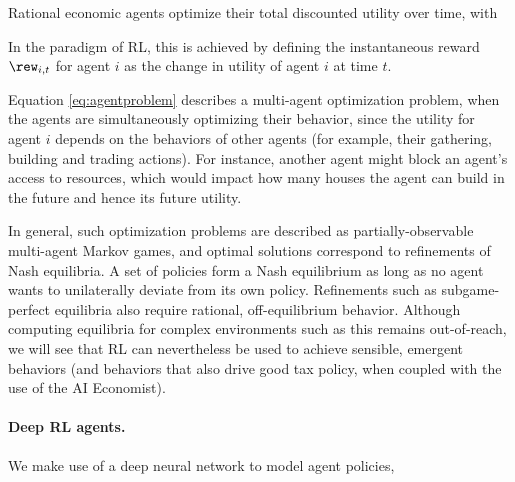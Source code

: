 Rational economic agents optimize their total discounted utility over time, with

In the paradigm of RL, this is achieved  by defining the instantaneous reward $\rew_{i,t}$ for agent $i$ as the change in utility of  agent $i$   at time $t$.


Equation \ref{eq:agentproblem} describes a multi-agent optimization problem, when the agents are simultaneously optimizing their behavior, since the utility for agent $i$ depends on the behaviors of other agents (for example, their gathering, building and trading actions).
For instance, another agent might block an agent's access to resources, which would impact how many houses the agent can build in the future and hence its future utility.

In general, such optimization problems are described as partially-observable multi-agent Markov games, and optimal solutions correspond to refinements of Nash equilibria.  A set of policies form a Nash equilibrium as long as no agent wants to unilaterally deviate from its own policy. Refinements such as  subgame-perfect equilibria also require rational, off-equilibrium behavior. Although computing equilibria for complex environments such as this remains out-of-reach,  we will see that RL can nevertheless be used to achieve sensible, emergent behaviors (and behaviors that also drive good tax policy, when coupled with the use of the AI Economist).


\paragraph{Deep RL agents.}
We make use of a deep neural network to model agent policies,

